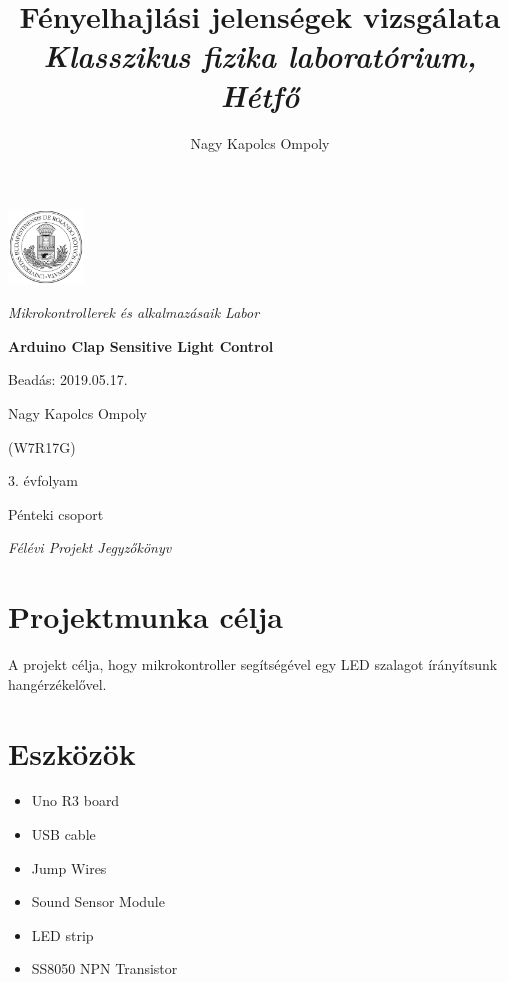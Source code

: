 \documentclass[a4paper,11pt]{article}
\author{Nagy Kapolcs Ompoly}
\title{Fényelhajlási jelenségek vizsgálata \\ \textsl{\small{Klasszikus fizika laboratórium, Hétfő}}}
\date{ }
\begin{document}
\begin{titlepage}
	\centering
	\includegraphics[width=0.15\textwidth]{eltecimer.jpg}\par
	\vspace{1cm}
	{\Large\itshape Mikrokontrollerek és alkalmazásaik Labor\par}
	{\huge\bfseries Arduino Clap Sensitive Light Control\par}
	
	\vfill
	
	\raggedleft
	Beadás: 2019.05.17.\par
	\vspace{0.5cm}
	Nagy Kapolcs Ompoly\par
	(W7R17G)\par
	3. évfolyam\par
	Pénteki csoport\par
	
	\vspace{0.5cm}

	\centering
	{\small\itshape Félévi Projekt Jegyzőkönyv \par}
\end{titlepage}
\clearpage
\setcounter{page}{1}
\newpage
\renewcommand{\thesection}{\Roman{section}}
\renewcommand{\thesubsection}{\thesection.\arabic{subsection}}
\renewcommand{\thesubsubsection}{\thesubsection.\arabic{subsubsection}}
\section{Projektmunka célja}
A projekt célja, hogy mikrokontroller segítségével egy LED szalagot írányítsunk hangérzékelővel.

\section{Eszközök}

\begin{itemize}
	\item Uno R3 board 
	\item USB cable
	\item Jump Wires
	\item Sound Sensor Module 
	\item LED strip
	\item SS8050 NPN Transistor
\end{itemize}
\end{document}
